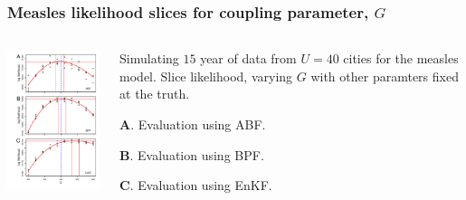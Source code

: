 \documentclass{beamer}
\begin{document}
\begin{frame}

\frametitle{Measles likelihood slices for coupling parameter, $G$}

\vspace{-5mm}

\begin{columns}[T] %
\begin{column}{.55\textwidth}
  \includegraphics[width=6cm]{slice_combined_plot-1.pdf}
\end{column}
\begin{column}{.52\textwidth}

  \vspace{6mm}
  
  Simulating $15$ year of data from $U=40$ cities for the measles model.
  Slice likelihood, varying $G$ with other paramters fixed at the truth.

  \vspace{7mm}

  {\bf A}. Evaluation using ABF.

    \vspace{4mm}

  {\bf B}. Evaluation using BPF.

    \vspace{4mm}

  {\bf C}. Evaluation using EnKF.

  
\end{column}
\end{columns}

\end{frame}
\end{document}
